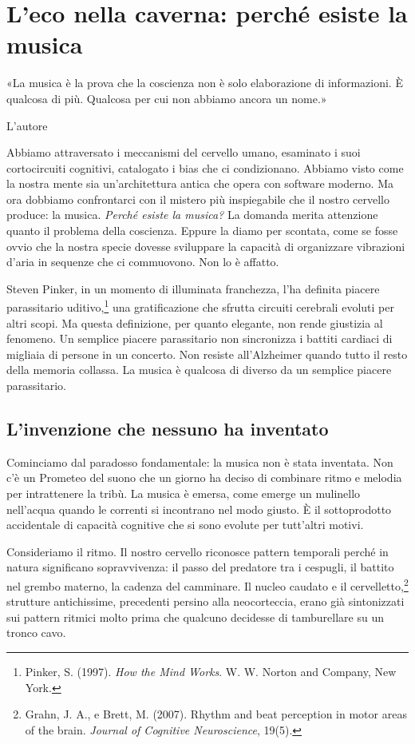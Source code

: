 \chapter{L'eco nella caverna: perch\'{e} esiste la musica}
\label{cap:p4c40}

\epigraph{«La musica è la prova che la coscienza non è solo elaborazione di informazioni. È qualcosa di più. Qualcosa per cui non abbiamo ancora un nome.»}{L'autore}

Abbiamo attraversato i meccanismi del cervello umano, esaminato i suoi cortocircuiti cognitivi, catalogato i bias che ci condizionano. Abbiamo visto come la nostra mente sia un'architettura antica che opera con software moderno. Ma ora dobbiamo confrontarci con il mistero pi\`{u} inspiegabile che il nostro cervello produce: la musica.
\bigskip
\textit{Perch\'{e} esiste la musica?}
\bigskip
La domanda merita attenzione quanto il problema della coscienza. Eppure la diamo per scontata, come se fosse ovvio che la nostra specie dovesse sviluppare la capacit\`{a} di organizzare vibrazioni d'aria in sequenze che ci commuovono. Non lo \`{e} affatto.

Steven Pinker, in un momento di illuminata franchezza, l'ha definita piacere parassitario uditivo,\footnote{Pinker, S. (1997). \textit{How the Mind Works}. W. W. Norton and Company, New York.} una gratificazione che sfrutta circuiti cerebrali evoluti per altri scopi. Ma questa definizione, per quanto elegante, non rende giustizia al fenomeno. Un semplice piacere parassitario non sincronizza i battiti cardiaci di migliaia di persone in un concerto. Non resiste all'Alzheimer quando tutto il resto della memoria collassa. La musica \`{e} qualcosa di diverso da un semplice piacere parassitario.

\section{L'invenzione che nessuno ha inventato}

Cominciamo dal paradosso fondamentale: la musica non \`{e} stata inventata. Non c'\`{e} un Prometeo del suono che un giorno ha deciso di combinare ritmo e melodia per intrattenere la trib\`{u}. La musica \`{e} emersa, come emerge un mulinello nell'acqua quando le correnti si incontrano nel modo giusto. \`{E} il sottoprodotto accidentale di capacit\`{a} cognitive che si sono evolute per tutt'altri motivi.

Consideriamo il ritmo. Il nostro cervello riconosce pattern temporali perch\'{e} in natura significano sopravvivenza: il passo del predatore tra i cespugli, il battito nel grembo materno, la cadenza del camminare. Il nucleo caudato e il cervelletto,\footnote{Grahn, J. A., e Brett, M. (2007). Rhythm and beat perception in motor areas of the brain. \textit{Journal of Cognitive Neuroscience}, 19(5).} strutture antichissime, precedenti persino alla neocorteccia, erano gi\`{a} sintonizzati sui pattern ritmici molto prima che qualcuno decidesse di tamburellare su un tronco cavo.

